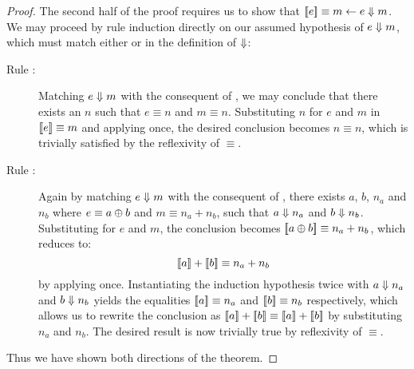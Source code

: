 \begin{proof}
\noindent The second half of the proof requires us to show that $\sb[e]
\equiv m \leftarrow e \Eval m$. We may proceed by rule induction directly on
our assumed hypothesis of $e \Downarrow m$, which must match either
 or  in the definition of $\Downarrow$:
\begin{description}
\item[Rule :]%
Matching $e \Downarrow m$ with the consequent of , we may
conclude that there exists an $n$ such that $e \equiv n$ and $m \equiv n$.
Substituting $n$ for $e$ and $m$ in $\sb[e] \equiv m$ and applying
 once, the desired conclusion becomes $n \equiv n$, which
is trivially satisfied by the reflexivity of $\equiv$.
\item[Rule :]%
Again by matching $e \Downarrow m$ with the consequent of ,
there exists $a$, $b$, $n_a$ and $n_b$ where $e \equiv a \oplus b$ and $m
\equiv n_a + n_b$, such that $a \Downarrow n_a$ and $b \Downarrow n_b$.
Substituting for $e$ and $m$, the conclusion becomes $\sb[a \Add b] \equiv
n_a + n_b$, which reduces to:
\[
	\sb[a] + \sb[b] \equiv n_a + n_b
\]
by applying  once. Instantiating the induction
hypothesis twice with $a \Downarrow n_a$ and $b \Downarrow n_b$ yields the
equalities $\sb[a] \equiv n_a$ and $\sb[b] \equiv n_b$ respectively, which
allows us to rewrite the conclusion as $\sb[a] + \sb[b] \equiv \sb[a]
+ \sb[b]$ by substituting $n_a$ and $n_b$. The desired result is now
trivially true by reflexivity of $\equiv$.
\end{description}

\noindent Thus we have shown both directions of the theorem.
\end{proof}


